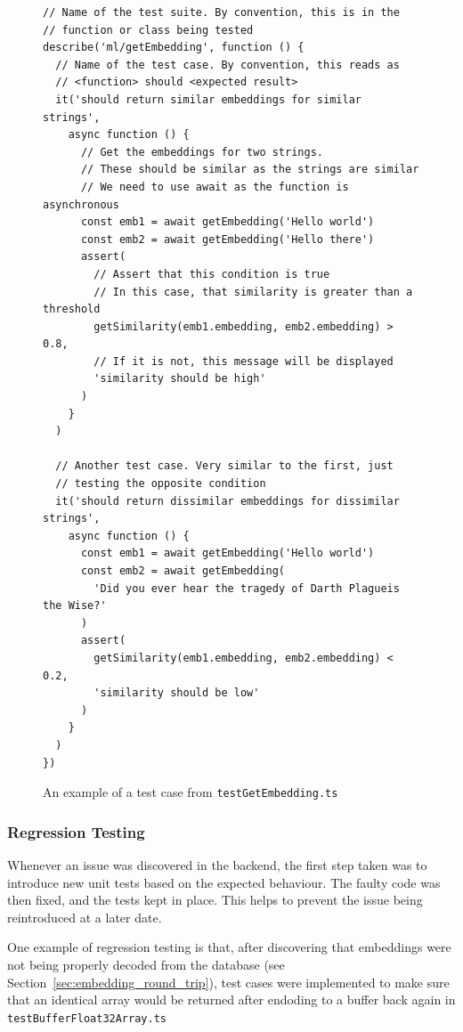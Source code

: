 \begin{figure}[p]
    \caption{\label{fig:test_case}An example of a test case from \texttt{testGetEmbedding.ts}}
    \begin{verbatim}
// Name of the test suite. By convention, this is in the
// function or class being tested
describe('ml/getEmbedding', function () {
  // Name of the test case. By convention, this reads as
  // <function> should <expected result>
  it('should return similar embeddings for similar strings',
    async function () {
      // Get the embeddings for two strings.
      // These should be similar as the strings are similar
      // We need to use await as the function is asynchronous
      const emb1 = await getEmbedding('Hello world')
      const emb2 = await getEmbedding('Hello there')
      assert(
        // Assert that this condition is true
        // In this case, that similarity is greater than a threshold
        getSimilarity(emb1.embedding, emb2.embedding) > 0.8,
        // If it is not, this message will be displayed
        'similarity should be high'
      )
    }
  )

  // Another test case. Very similar to the first, just
  // testing the opposite condition
  it('should return dissimilar embeddings for dissimilar strings',
    async function () {
      const emb1 = await getEmbedding('Hello world')
      const emb2 = await getEmbedding(
        'Did you ever hear the tragedy of Darth Plagueis the Wise?'
      )
      assert(
        getSimilarity(emb1.embedding, emb2.embedding) < 0.2,
        'similarity should be low'
      )
    }
  )
})
    \end{verbatim}
\end{figure}

\subsubsection{Regression Testing}

Whenever an issue was discovered in the backend, the first step taken was to
introduce new unit tests based on the expected behaviour. The faulty code was
then fixed, and the tests kept in place. This helps to prevent the issue being
reintroduced at a later date.

One example of regression testing is that, after discovering that embeddings were
not being properly decoded from the database (see Section~\ref{sec:embedding_round_trip}),
test cases were implemented to make sure that an identical array would be returned
after endoding to a buffer back again in \texttt{testBufferFloat32Array.ts}

